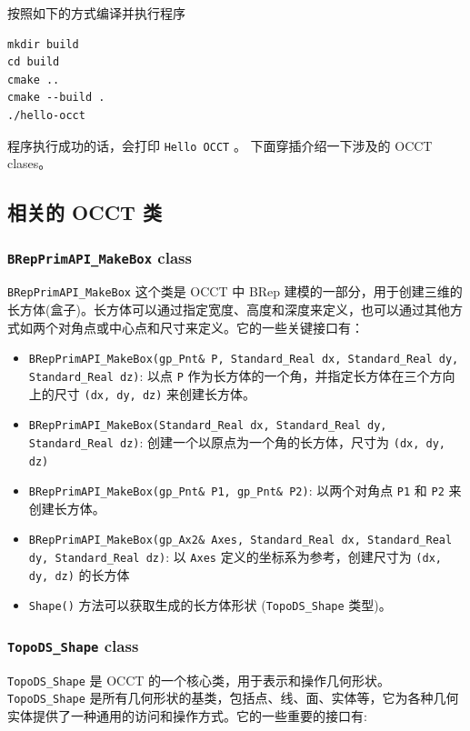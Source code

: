 \documentclass[11pt]{article}
\begin{document}
按照如下的方式编译并执行程序

\begin{verbatim}
mkdir build
cd build
cmake ..
cmake --build .
./hello-occt
\end{verbatim}

程序执行成功的话，会打印 \texttt{Hello OCCT} 。
下面穿插介绍一下涉及的 OCCT clases。
\subsection{相关的 OCCT 类}
\label{sec:orgd9a0094}

\subsubsection{\texttt{BRepPrimAPI\_MakeBox} class}
\label{sec:org12214df}

\texttt{BRepPrimAPI\_MakeBox} 这个类是 OCCT 中 BRep 建模的一部分，用于创建三维的长方体(盒子)。长方体可以通过指定宽度、高度和深度来定义，也可以通过其他方式如两个对角点或中心点和尺寸来定义。它的一些关键接口有：

\begin{itemize}
\item \texttt{BRepPrimAPI\_MakeBox(gp\_Pnt\& P, Standard\_Real dx, Standard\_Real dy, Standard\_Real dz)}: 以点 \texttt{P} 作为长方体的一个角，并指定长方体在三个方向上的尺寸 \texttt{(dx, dy, dz)} 来创建长方体。
\item \texttt{BRepPrimAPI\_MakeBox(Standard\_Real dx, Standard\_Real dy, Standard\_Real dz)}: 创建一个以原点为一个角的长方体，尺寸为 \texttt{(dx, dy, dz)}
\item \texttt{BRepPrimAPI\_MakeBox(gp\_Pnt\& P1, gp\_Pnt\& P2)}: 以两个对角点 \texttt{P1} 和 \texttt{P2} 来创建长方体。
\item \texttt{BRepPrimAPI\_MakeBox(gp\_Ax2\& Axes, Standard\_Real dx, Standard\_Real dy, Standard\_Real dz)}: 以 \texttt{Axes} 定义的坐标系为参考，创建尺寸为 \texttt{(dx, dy, dz)} 的长方体
\item \texttt{Shape()} 方法可以获取生成的长方体形状 (\texttt{TopoDS\_Shape} 类型)。
\end{itemize}
\subsubsection{\texttt{TopoDS\_Shape} class}
\label{sec:org4580fc5}

\texttt{TopoDS\_Shape} 是 OCCT 的一个核心类，用于表示和操作几何形状。 \texttt{TopoDS\_Shape} 是所有几何形状的基类，包括点、线、面、实体等，它为各种几何实体提供了一种通用的访问和操作方式。它的一些重要的接口有:
\end{document}
